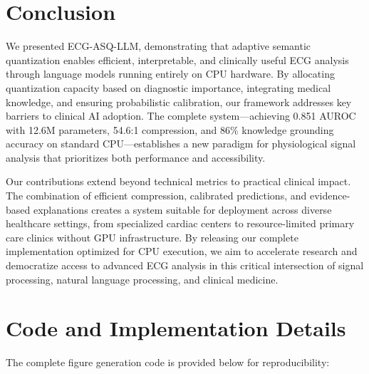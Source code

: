 \documentclass[journal]{IEEEtran}
\begin{document}
\section{Conclusion}

We presented ECG-ASQ-LLM, demonstrating that adaptive semantic quantization enables efficient, interpretable, and clinically useful ECG analysis through language models running entirely on CPU hardware. By allocating quantization capacity based on diagnostic importance, integrating medical knowledge, and ensuring probabilistic calibration, our framework addresses key barriers to clinical AI adoption. The complete system---achieving 0.851 AUROC with 12.6M parameters, 54.6:1 compression, and 86\% knowledge grounding accuracy on standard CPU---establishes a new paradigm for physiological signal analysis that prioritizes both performance and accessibility.

Our contributions extend beyond technical metrics to practical clinical impact. The combination of efficient compression, calibrated predictions, and evidence-based explanations creates a system suitable for deployment across diverse healthcare settings, from specialized cardiac centers to resource-limited primary care clinics without GPU infrastructure. By releasing our complete implementation optimized for CPU execution, we aim to accelerate research and democratize access to advanced ECG analysis in this critical intersection of signal processing, natural language processing, and clinical medicine.

\section*{Code and Implementation Details}

The complete figure generation code is provided below for reproducibility:
\end{document}

